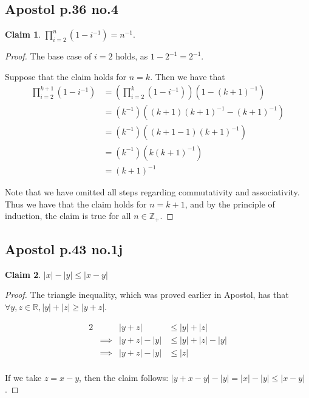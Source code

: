 \documentclass[12pt,letterpaper]{article}
\theoremstyle{definition}
\newtheorem*{claim}{Claim}
\newcommand{\R}{\mathbb{R}}
\newcommand{\Z}{\mathbb{Z}}
\begin{document}
\subsection*{Apostol p.36 no.4}

\begin{claim}
    $\prod_{i=2}^{n}(1 - i^{-1}) = n^{-1}$.
\end{claim}

\begin{proof}
    The base case of $i = 2$ holds, as $1 - 2^{-1} = 2^{-1}$.
    
    Suppose that the claim holds for $n = k$.
    Then we have that
    \begin{align*}
        \prod_{i=2}^{k+1}(1 - i^{-1}) &= (\prod_{i=2}^{k}(1 - i^{-1}))(1 - (k+1)^{-1}) \\
        &= (k^{-1})((k+1)(k+1)^{-1} - (k+1)^{-1}) \\
        &= (k^{-1})((k+1-1)(k+1)^{-1}) \\
        &= (k^{-1})(k(k+1)^{-1}) \\
        &= (k+1)^{-1}
    \end{align*}

    Note that we have omitted all steps regarding commutativity and associativity.
    Thus we have that the claim holds for $n = k+1$, and by the principle of induction,
    the claim is true for all $n \in \Z_+$. 
\end{proof}

\subsection*{Apostol p.43 no.1j}

\begin{claim}
    $|x| - |y| \leq |x - y|$
\end{claim}

\begin{proof}
    The triangle inequality, which was proved earlier in Apostol,
    has that $\forall y,z \in \R, |y|+|z| \geq |y+z|$.

    \begin{alignat*}{2}
        && |y+z| &\leq |y| + |z| \\
        &\implies& |y+z| - |y| &\leq |y| + |z| - |y| \\
        &\implies& |y+z| - |y| &\leq |z|\\
    \end{alignat*}

    If we take $z = x - y$, then the claim follows:
    $|y + x - y| - |y| = |x| - |y| \leq |x - y|$.
\end{proof}
\end{document}
